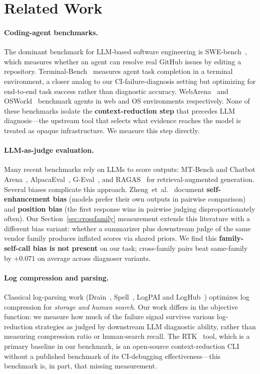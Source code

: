 \documentclass{article}
\begin{document}
\section{Related Work}

\paragraph{Coding-agent benchmarks.}
The dominant benchmark for LLM-based software engineering is
SWE-bench~\cite{jimenez2024swebench}, which measures whether an
agent can resolve real GitHub issues by editing a repository.
Terminal-Bench~\cite{terminalbench2024} measures agent task
completion in a terminal environment, a closer analog to our
CI-failure-diagnosis setting but optimizing for end-to-end task
success rather than diagnostic accuracy.
WebArena~\cite{zhou2024webarena} and OSWorld~\cite{xie2024osworld}
benchmark agents in web and OS environments respectively. None of
these benchmarks isolate the \textbf{context-reduction step} that
precedes LLM diagnosis---the upstream tool that selects what
evidence reaches the model is treated as opaque infrastructure. We
measure this step directly.

\paragraph{LLM-as-judge evaluation.}
Many recent benchmarks rely on LLMs to score outputs: MT-Bench and
Chatbot Arena~\cite{zheng2023judging},
AlpacaEval~\cite{li2023alpacaeval}, G-Eval~\cite{liu2023geval}, and
RAGAS~\cite{es2024ragas} for retrieval-augmented generation.
Several biases complicate this approach.
Zheng~et~al.~\cite{zheng2023judging} document
\textbf{self-enhancement bias} (models prefer their own outputs in
pairwise comparison) and \textbf{position bias} (the first response
wins in pairwise judging disproportionately often). Our
Section~\ref{sec:crossfamily} measurement extends this literature
with a different bias variant: whether a summarizer plus downstream
judge of the same vendor family produces inflated scores via shared
priors. We find this \textbf{family-self-call bias is not present}
on our task; cross-family pairs beat same-family by $+0.071$ on
average across diagnoser variants.

\paragraph{Log compression and parsing.}
Classical log-parsing work (Drain~\cite{he2017drain},
Spell~\cite{du2016spell}, LogPAI and LogHub~\cite{zhu2019tools})
optimizes log compression for \emph{storage and human search}. Our
work differs in the objective function: we measure how much of the
failure signal survives various log-reduction strategies as judged
by downstream LLM diagnostic ability, rather than measuring
compression ratio or human-search recall. The RTK~\cite{rtk} tool,
which is a primary baseline in our benchmark, is an open-source
context-reduction CLI without a published benchmark of its
CI-debugging effectiveness---this benchmark is, in part, that
missing measurement.
\end{document}
